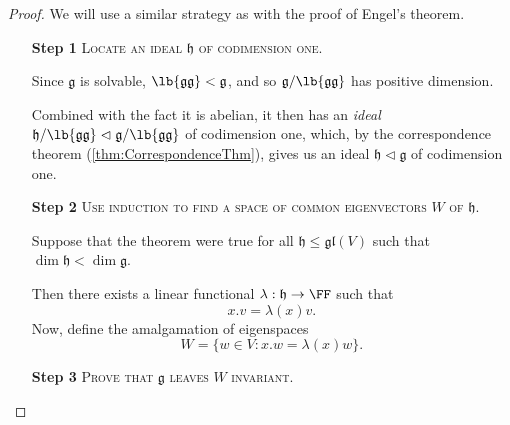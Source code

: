 \documentclass{article}
\newcommand*\tle{\ensuremath{\mathrel{\lhd}}}
\DeclarePairedDelimiter\lb\lbrack\rbrack
\newcommand*\frkg{{\ensuremath{\mathfrak{g}}}}
\newcommand*\frkh{{\ensuremath{\mathfrak{h}}}}
\newcommand*\gl{\ensuremath{\mathfrak{gl}}}
\newcommand*\acts{.}
\begin{document}
\begin{proof} 
    We will use a similar strategy as with the proof of Engel's theorem.
    \begin{itemize}
        \item[\textbf{Step 1}] 
            \textsc{\color{Crimson} Locate an ideal $\frkh$ of codimension one.}

            Since $\frkg$ is solvable, $\lb{\frkg\frkg} < \frkg$, and so $\frkg/\lb{\frkg\frkg}$ has positive dimension.

            Combined with the fact it is abelian, it then has an \textit{ideal} $\frkh/\lb{\frkg\frkg} \tle \frkg/\lb{\frkg\frkg}$ of codimension one, which, by the correspondence theorem (\ref{thm:CorrespondenceThm}), gives us an ideal $\frkh \tle \frkg$ of codimension one.
        \item[\textbf{Step 2}]
            \textsc{\color{Crimson} Use induction to find a space of common eigenvectors $W$ of $\frkh$.}

            Suppose that the theorem were true for all $\frkh \leq \gl(V)$ such that $\dim \frkh < \dim \frkg$.

            Then there exists a linear functional $\lambda: \frkh \to \FF$ such that
            \[
                x \acts v 
                =
                \lambda(x)v.
            \]
            Now, define the amalgamation of eigenspaces 
            \[
                W
                =
                \Big\{
                    w \in V:
                    x \acts w
                    =
                    \lambda(x)w
                \Big\}.
            \]
        \item[\textbf{Step 3}]
            \textsc{\color{Crimson} Prove that $\frkg$ leaves $W$ invariant.}


\end{itemize}
\end{proof}
\end{document}

